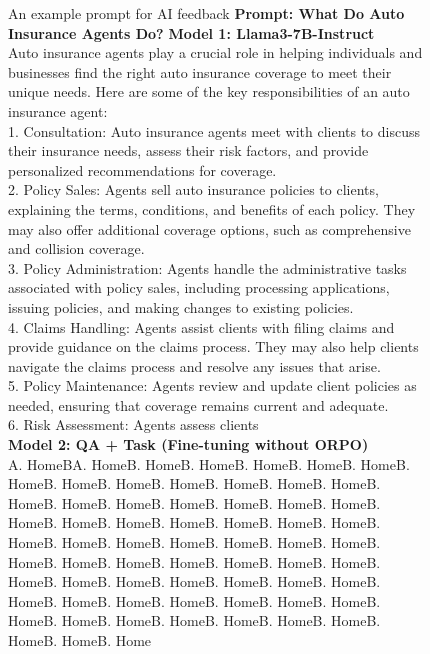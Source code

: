 \documentclass[conference]{IEEEtran}
\begin{document}
\begin{figure}[h]
\begin{AIbox}{An example prompt for AI feedback}
{\bf Prompt: What Do Auto Insurance Agents Do?}
{%
\tcbline
\textbf{Model 1: Llama3-7B-Instruct}\\
Auto insurance agents play a crucial role in helping individuals and businesses find the right auto insurance coverage to meet their unique needs. Here are some of the key responsibilities of an auto insurance agent:\\1. Consultation: Auto insurance agents meet with clients to discuss their insurance needs, assess their risk factors, and provide personalized recommendations for coverage.\\2. Policy Sales: Agents sell auto insurance policies to clients, explaining the terms, conditions, and benefits of each policy. They may also offer additional coverage options, such as comprehensive and collision coverage.\\3. Policy Administration: Agents handle the administrative tasks associated with policy sales, including processing applications, issuing policies, and making changes to existing policies.\\4. Claims Handling: Agents assist clients with filing claims and provide guidance on the claims process. They may also help clients navigate the claims process and resolve any issues that arise.\\5. Policy Maintenance: Agents review and update client policies as needed, ensuring that coverage remains current and adequate.\\6. Risk Assessment: Agents assess clients\\

\textbf{Model 2: QA + Task (Fine-tuning without ORPO)}\\
A. HomeBA. HomeB. HomeB. HomeB. HomeB. HomeB. HomeB. HomeB. HomeB. HomeB. HomeB. HomeB. HomeB. HomeB. HomeB. HomeB. HomeB. HomeB. HomeB. HomeB. HomeB. HomeB. HomeB. HomeB. HomeB. HomeB. HomeB. HomeB. HomeB. HomeB. HomeB. HomeB. HomeB. HomeB. HomeB. HomeB. HomeB. HomeB. HomeB. HomeB. HomeB. HomeB. HomeB. HomeB. HomeB. HomeB. HomeB. HomeB. HomeB. HomeB. HomeB. HomeB. HomeB. HomeB. HomeB. HomeB. HomeB. HomeB. HomeB. HomeB. HomeB. HomeB. HomeB. HomeB. HomeB. Home\\

}
\end{AIbox}
\end{figure}
\end{document}
